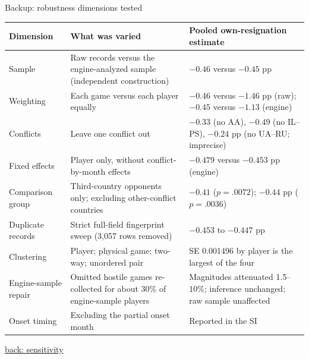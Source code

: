 \documentclass[aspectratio=169,11pt,t]{beamer}
\newcommand{\backto}[2]{\vfill\hfill\hyperlink{#1}{\textcolor{linkblue}{\scriptsize\textsf{back: #2}}}}
\begin{document}
\begin{frame}[label=bk-robust]{Backup: robustness dimensions tested}
  \centering
  \scriptsize
  \setlength{\tabcolsep}{3pt}
  \begin{tabular}{@{}p{}p{}p{}@{}}
    \toprule
    Dimension & What was varied & Pooled own-resignation estimate \\
    \midrule
    Sample & Raw records versus the engine-analyzed sample (independent construction) & $-0.46$ versus $-0.45$ pp \\
    Weighting & Each game versus each player equally & $-0.46$ versus $-1.46$ pp (raw); $-0.45$ versus $-1.13$ (engine) \\
    Conflicts & Leave one conflict out & $-0.33$ (no AA), $-0.49$ (no IL--PS), $-0.24$ pp (no UA--RU; imprecise) \\
    Fixed effects & Player only, without conflict-by-month effects & $-0.479$ versus $-0.453$ pp (engine) \\
    Comparison group & Third-country opponents only; excluding other-conflict countries & $-0.41$ ($p = .0072$); $-0.44$ pp ($p = .0036$) \\
    Duplicate records & Strict full-field fingerprint sweep (3,057 rows removed) & $-0.453$ to $-0.447$ pp \\
    Clustering & Player; physical game; two-way; unordered pair & SE 0.001496 by player is the largest of the four \\
    Engine-sample repair & Omitted hostile games re-collected for about 30\% of engine-sample players & Magnitudes attenuated 1.5--10\%; inference unchanged; raw sample unaffected \\
    Onset timing & Excluding the partial onset month & Reported in the SI \\
    \bottomrule
  \end{tabular}
  \backto{sensitivity}{sensitivity}
\end{frame}
\end{document}
